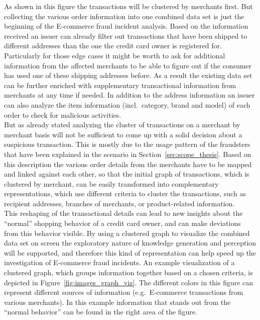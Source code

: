 As shown in this figure the transactions will be clustered by merchants first. But collecting the various order information into one combined data set is just the beginning of the \gls{E-commerce} fraud incident analysis. Based on the information received an issuer can already filter out transactions that have been shipped to different addresses than the one the credit card owner is registered for. Particularly for those edge cases it might be worth to ask for additional information from the affected merchants to be able to figure out if the consumer has used one of these shipping addresses before. As a result the existing data set can be further enriched with supplementary transactional information from merchants at any time if needed. In addition to the address information an issuer can also analyze the item information (incl.\ category, brand and model) of each order to check for malicious activities. \\

But as already stated analyzing the cluster of transactions on a merchant by merchant basis will not be sufficient to come up with a solid decision about a suspicious transaction. This is mostly due to the usage pattern of the fraudsters that have been explained in the scenario in Section~\ref{sec:scope_thesis}. Based on this description the various order details from the merchants have to be mapped and linked against each other, so that the initial graph of transactions, which is clustered by merchant, can be easily transformed into complementary representations, which use different criteria to cluster the transactions, such as recipient addresses, branches of merchants, or product-related information. \\

This reshaping of the transactional details can lead to new insights about the ``normal'' shopping behavior of a credit card owner, and can make deviations from this behavior visible. By using a clustered graph to visualize the combined data set on screen the exploratory nature of knowledge generation and perception will be supported, and therefore this kind of representation can help speed up the investigation of \gls{E-commerce} fraud incidents. An example visualization of a clustered graph, which groups information together based on a chosen criteria, is depicted in Figure~\ref{fig:images_graph_viz}. The different colors in this figure can represent different sources of information (e.g.\ \gls{E-commerce} transactions from various merchants). In this example information that stands out from the ``normal behavior'' can be found in the  right area of the figure. \@

